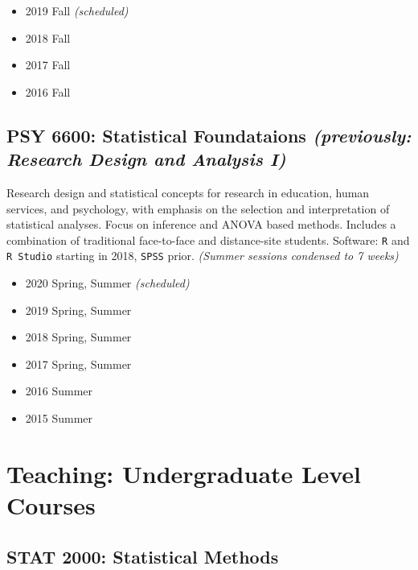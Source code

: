 \documentclass[11pt,a4paper,]{moderncv}
\providecommand{\tightlist}{%
	\setlength{\itemsep}{0pt}\setlength{\parskip}{0pt}}
\begin{document}
\begin{itemize}
\tightlist
\item
  2019 Fall \emph{(scheduled)}
\item
  2018 Fall
\item
  2017 Fall
\item
  2016 Fall
\end{itemize}

\hypertarget{psy-6600-statistical-foundataions-previously-research-design-and-analysis-i}{%
\subsection{\texorpdfstring{PSY 6600: Statistical Foundataions
\emph{(previously: Research Design and Analysis
I)}}{PSY 6600: Statistical Foundataions (previously: Research Design and Analysis I)}}\label{psy-6600-statistical-foundataions-previously-research-design-and-analysis-i}}

Research design and statistical concepts for research in education,
human services, and psychology, with emphasis on the selection and
interpretation of statistical analyses. Focus on inference and ANOVA
based methods. Includes a combination of traditional face-to-face and
distance-site students. Software: \texttt{R} and \texttt{R\ Studio}
starting in 2018, \texttt{SPSS} prior. \emph{(Summer sessions condensed
to 7 weeks)}

\begin{itemize}
\tightlist
\item
  2020 Spring, Summer \emph{(scheduled)}
\item
  2019 Spring, Summer
\item
  2018 Spring, Summer
\item
  2017 Spring, Summer
\item
  2016 Summer
\item
  2015 Summer
\end{itemize}

\vspace{1.5cm}

\hypertarget{teaching-undergraduate-level-courses}{%
\section{Teaching: Undergraduate Level
Courses}\label{teaching-undergraduate-level-courses}}

\hypertarget{stat-2000-statistical-methods}{%
\subsection{STAT 2000: Statistical
Methods}\label{stat-2000-statistical-methods}}
\end{document}
